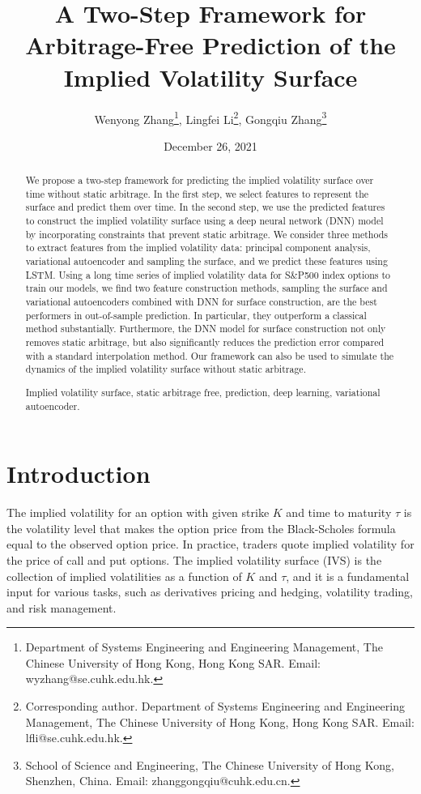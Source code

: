 \documentclass[11pt,a4paper]{article}
\title{A Two-Step Framework for Arbitrage-Free Prediction of the Implied Volatility Surface}
\author{Wenyong Zhang\thanks{Department of Systems Engineering and Engineering Management, The Chinese University of Hong Kong, Hong Kong SAR. Email: wyzhang@se.cuhk.edu.hk.}, Lingfei Li\thanks{Corresponding author. Department of Systems Engineering and Engineering Management, The Chinese University of Hong Kong, Hong Kong SAR. Email: lfli@se.cuhk.edu.hk.}, Gongqiu Zhang\thanks{School of Science and Engineering, The Chinese University of Hong Kong, Shenzhen, China. Email: zhanggongqiu@cuhk.edu.cn.}}
\date{December 26, 2021}
\theoremstyle{remark}
\begin{document}
\maketitle

\begin{abstract}
  We propose a two-step framework for predicting the implied volatility surface over time without static arbitrage. In the first step, we select features to represent the surface and predict them over time. In the second step, we use the predicted features to construct the implied volatility surface using a deep neural network (DNN) model by incorporating constraints that prevent static arbitrage. We consider three methods to extract features from the implied volatility data: principal component analysis, variational autoencoder and sampling the surface, and we predict these features using LSTM. Using a long time series of implied volatility data for S\&P500 index options to train our models, we find two feature construction methods, sampling the surface and variational autoencoders combined with DNN for surface construction, are the best performers in out-of-sample prediction. In particular, they outperform a classical method substantially. Furthermore, the DNN model for surface construction not only removes static arbitrage, but also significantly reduces the prediction error compared with a standard interpolation method. Our framework can also be used to simulate the dynamics of the implied volatility surface without static arbitrage. 
  
  \bigskip
  \begin{keywords}
  Implied volatility surface, static arbitrage free, prediction, deep learning, variational autoencoder.
  \end{keywords}
\end{abstract}

\section{Introduction}\label{sec:intro}
The implied volatility for an option with given strike $K$ and time to maturity $\tau$ is the volatility level that makes the option price from the Black-Scholes formula equal to the observed option price. In practice, traders quote implied volatility for the price of call and put options. The implied volatility surface (IVS) is the collection of implied volatilities as a function of $K$ and $\tau$, and it is a fundamental input for various tasks, such as derivatives pricing and hedging, volatility trading, and risk management. 
\end{document}
